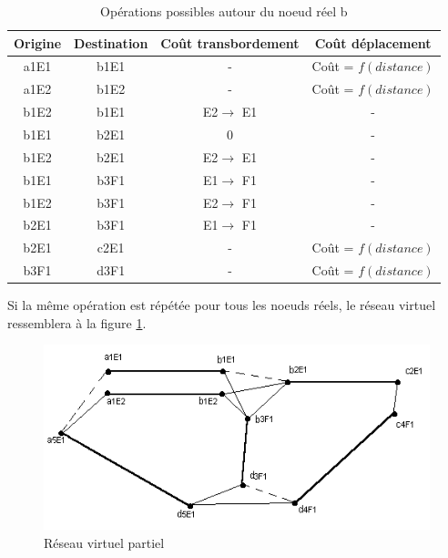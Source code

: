 \begin{table}[htbp]
\begin{center}
\begin{tabular}{cccc}
\hline
Origine & Destination & Coût transbordement & Coût déplacement\\
\hline
a1E1 & b1E1 & -                   & Coût = $f(distance)$\\

a1E2 & b1E2 & -                   & Coût = $f(distance)$\\

b1E2 & b1E1 & E2$ \rightarrow$ E1 & -\\

b1E1 & b2E1 & 0 & -\\ b1E2 & b2E1 & E2$ \rightarrow$ E1 & -\\

b1E1 & b3F1 & E1$ \rightarrow$ F1 & -

\\ b1E2 & b3F1 & E2$ \rightarrow$ F1 & -

\\b2E1 & b3F1 & E1$ \rightarrow$ F1 & -\\ b2E1 & c2E1 & - & Coût = $f(distance)$\\

b3F1 & d3F1 & -                   & Coût = $f(distance)$\\
\hline
\end{tabular}
\caption{\label{tab3_4} Op\'erations possibles autour du noeud r\'eel b}
\end{center}
\end{table}


Si la même opération est répétée pour tous les noeuds réels, le réseau virtuel
ressemblera à la figure \ref{f3_6}.

\begin{figure}[htbp]
\centerline{\includegraphics[width=12cm]{f3_6.png}}
\caption{\label{f3_6} R\'eseau virtuel partiel}
\end{figure}


